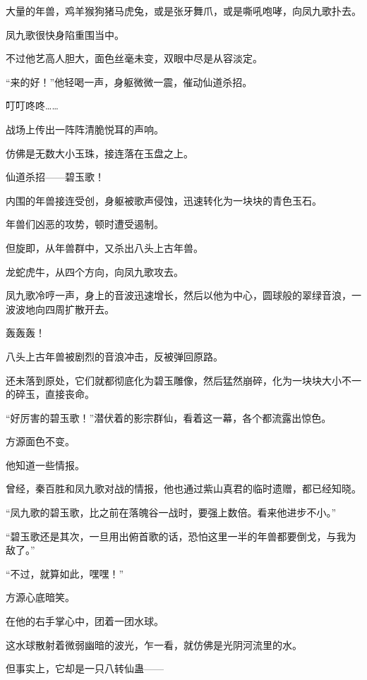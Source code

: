 
\begin{this_body}



大量的年兽，鸡羊猴狗猪马虎兔，或是张牙舞爪，或是嘶吼咆哮，向凤九歌扑去。

凤九歌很快身陷重围当中。

不过他艺高人胆大，面色丝毫未变，双眼中尽是从容淡定。

“来的好！”他轻喝一声，身躯微微一震，催动仙道杀招。

叮叮咚咚……

战场上传出一阵阵清脆悦耳的声响。

仿佛是无数大小玉珠，接连落在玉盘之上。

仙道杀招——碧玉歌！

内围的年兽接连受创，身躯被歌声侵蚀，迅速转化为一块块的青色玉石。

年兽们凶恶的攻势，顿时遭受遏制。

但旋即，从年兽群中，又杀出八头上古年兽。

龙蛇虎牛，从四个方向，向凤九歌攻去。

凤九歌冷哼一声，身上的音波迅速增长，然后以他为中心，圆球般的翠绿音浪，一波波地向四周扩散开去。

轰轰轰！

八头上古年兽被剧烈的音浪冲击，反被弹回原路。

还未落到原处，它们就都彻底化为碧玉雕像，然后猛然崩碎，化为一块块大小不一的碎玉，直接丧命。

“好厉害的碧玉歌！”潜伏着的影宗群仙，看着这一幕，各个都流露出惊色。

方源面色不变。

他知道一些情报。

曾经，秦百胜和凤九歌对战的情报，他也通过紫山真君的临时遗赠，都已经知晓。

“凤九歌的碧玉歌，比之前在落魄谷一战时，要强上数倍。看来他进步不小。”

“碧玉歌还是其次，一旦用出俯首歌的话，恐怕这里一半的年兽都要倒戈，与我为敌了。”

“不过，就算如此，嘿嘿！”

方源心底暗笑。

在他的右手掌心中，团着一团水球。

这水球散射着微弱幽暗的波光，乍一看，就仿佛是光阴河流里的水。

但事实上，它却是一只八转仙蛊——


\end{this_body}
